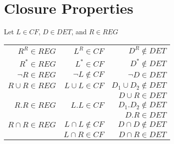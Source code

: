\section{Closure Properties}

Let $L \in CF$, $D \in DET$, and $R \in REG$

\begin{table}[H]
    \centering
    \begin{tabularx}{\textwidth}{| r | r | r |}
        $R^R \in REG$ & $L^R \in CF$ & $D^R \notin DET$ \\
        $R^* \in REG$ & $L^* \in CF$ & $D^* \notin DET$ \\
        $\neg R \in REG$ & $\neg L \notin CF$ & $\neg D \in DET$ \\
        $R \cup R \in REG$ & $L \cup L \in CF$ & $D_1 \cup D_2 \notin DET$ \\
        & & $D \cup R \in DET$ \\
        $R . R \in REG$ & $L . L \in CF$ & $D_1.D_2 \notin DET$ \\
        & & $D.R \in DET$ \\
        $R \cap R \in REG$ & $L \cap L \notin CF$ & $D \cap D \notin DET$ \\
        & $L \cap R \in CF$ & $D \cap R \in DET$ \\
    \end{tabularx}
\end{table}
